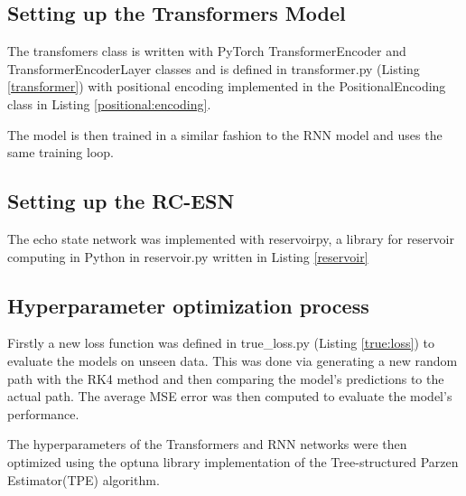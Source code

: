 \documentclass[11pt]{article}
\begin{document}
\subsection{Setting up the Transformers Model}

The transfomers class is written with PyTorch TransformerEncoder and TransformerEncoderLayer classes and is defined in transformer.py (Listing \ref{transformer}) with positional encoding implemented in the PositionalEncoding class in Listing \ref{positional:encoding}.

The model is then trained in a similar fashion to the RNN model and uses the same training loop.

\subsection{Setting up the RC-ESN}

The echo state network was implemented with reservoirpy, a library for reservoir computing in Python in reservoir.py written in Listing \ref{reservoir}

\subsection{Hyperparameter optimization process}
Firstly a new loss function was defined in true\_loss.py (Listing \ref{true:loss}) to evaluate the models on unseen data. This was done via generating a new random path with the RK4 method and then comparing the model's predictions to the actual path. The average MSE error was then computed to evaluate the model's performance.


The hyperparameters of the Transformers and RNN networks were then optimized using the optuna library implementation of the Tree-structured Parzen Estimator(TPE) algorithm. 
\end{document}
